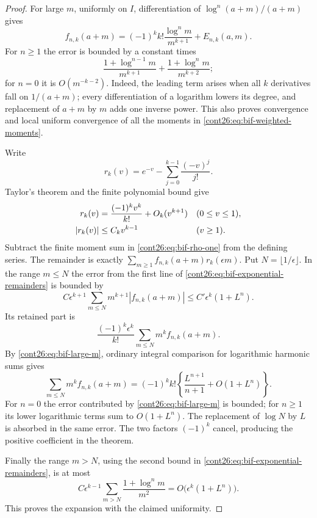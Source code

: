\begin{proof}
For large $m$, uniformly on $I$, differentiation of
$\log^n(a+m)/(a+m)$ gives
\begin{equation}\label{cont26:eq:bif-large-m}
 f_{n,k}(a+m)=(-1)^k k!\frac{\log^n m}{m^{k+1}}+E_{n,k}(a,m).
\end{equation}
For $n\geq1$ the error is bounded by a constant times
\[
 \frac{1+\log^{n-1}m}{m^{k+1}}
       +\frac{1+\log^n m}{m^{k+2}};
\]
for $n=0$ it is $O(m^{-k-2})$. Indeed, the leading term arises when
all $k$ derivatives fall on $1/(a+m)$; every differentiation of a
logarithm lowers its degree, and replacement of $a+m$ by $m$ adds
one inverse power. This also proves convergence and local uniform
convergence of all the moments in \eqref{cont26:eq:bif-weighted-moments}.

Write
\[
 r_k(v)=e^{-v}-\sum_{j=0}^{k-1}\frac{(-v)^j}{j!}.
\]
Taylor's theorem and the finite polynomial bound give
\begin{align}\label{cont26:eq:bif-exponential-remainders}
 r_k(v)&=\frac{(-1)^k v^k}{k!}+O_k(v^{k+1})
                         &&(0\leq v\leq1),\\
 |r_k(v)|&\leq C_k v^{k-1}&&(v\geq1).\notag
\end{align}
Subtract the finite moment sum in \eqref{cont26:eq:bif-rho-one} from the
defining series. The remainder is exactly
$\sum_{m\geq1}f_{n,k}(a+m)r_k(\epsilon m)$.
Put $N=\lfloor1/\epsilon\rfloor$. In the range $m\leq N$ the error
from the first line of \eqref{cont26:eq:bif-exponential-remainders} is bounded by
\[
 C\epsilon^{k+1}\sum_{m\leq N}
                 m^{k+1}|f_{n,k}(a+m)|
   \leq C'\epsilon^k(1+L^n).
\]
Its retained part is
\[
 \frac{(-1)^k\epsilon^k}{k!}
       \sum_{m\leq N}m^k f_{n,k}(a+m).
\]
By \eqref{cont26:eq:bif-large-m}, ordinary integral comparison for logarithmic
harmonic sums gives
\[
 \sum_{m\leq N}m^k f_{n,k}(a+m)
   =(-1)^k k!\left\{\frac{L^{n+1}}{n+1}
                                +O(1+L^n)\right\}.
\]
For $n=0$ the error contributed by \eqref{cont26:eq:bif-large-m} is bounded;
for $n\geq1$ its lower logarithmic terms sum to $O(1+L^n)$.
The replacement of $\log N$ by $L$ is absorbed in the same error.
The two factors $(-1)^k$ cancel, producing the positive coefficient
in the theorem.

Finally the range $m>N$, using the second bound in
\eqref{cont26:eq:bif-exponential-remainders}, is at most
\[
 C\epsilon^{k-1}\sum_{m>N}\frac{1+\log^n m}{m^2}
       =O\bigl(\epsilon^k(1+L^n)\bigr).
\]
This proves the expansion with the claimed uniformity.


\end{proof}
